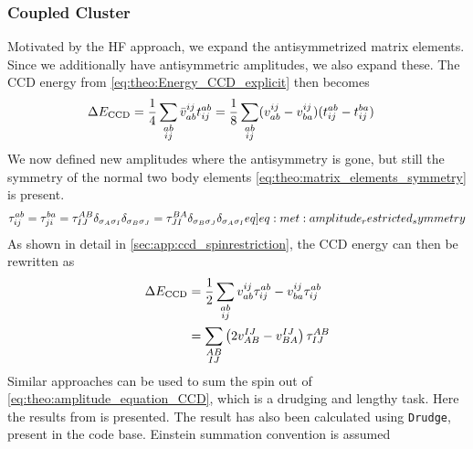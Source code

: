 \subsubsection{Coupled Cluster}
Motivated by the HF approach, we expand the antisymmetrized matrix elements. Since we additionally have antisymmetric amplitudes, we also expand these. The CCD energy from \cref{eq:theo:Energy_CCD_explicit} then becomes 
\begin{align*}
    \Delta E_{\text{CCD}}  &= \frac{1}{4} \sum_{\substack{ab\\ij}} \bar{v}^{ij}_{ab}t^{ab}_{ij} = \frac{1}{8}\sum_{\substack{ab\\ij}} (v^{ij}_{ab} - v^{ij}_{ba})(t^{ab}_{ij}- t^{ba}_{ij})
\end{align*}
We now defined new amplitudes where the antisymmetry is gone, but still the symmetry of the normal two body elements \cref{eq:theo:matrix_elements_symmetry} is present.
\begin{align}
    \amplituderestrict{ab}{ij} = \amplituderestrict{ba}{ji} = \amplituderestrict{AB}{IJ}\delta_{\sigma_{A}\sigma_{I}}\delta_{\sigma_{B}\sigma_{J}} = \amplituderestrict{BA}{JI}\delta_{\sigma_{B}\sigma_{J}}\delta_{\sigma_{A}\sigma_{I}} \label[eq]{eq:met:amplitude_restricted_symmetry}
\end{align}
As shown in detail in \cref{sec:app:ccd_spinrestriction}, the CCD energy can then be rewritten as
\begin{align*}
    \Delta E_{\text{CCD}}  &= \frac{1}{2}\sum_{\substack{ab\\ij}} v^{ij}_{ab} \tau^{ab}_{ij} - v^{ij}_{ba} \tau^{ab}_{ij} \\
    &= \sum_{\substack{AB\\IJ}} \left(2 v^{IJ}_{AB} - v^{IJ}_{BA}\right) \tau^{AB}_{IJ}
\end{align*}
Similar approaches can be used to sum the spin out of \cref{eq:theo:amplitude_equation_CCD}, which is a drudging and lengthy task. Here the results from  \citep{shavitt_bartlett_2009} is presented. The result has also been calculated using \verb|Drudge|, present in the code base. Einstein summation convention is assumed

